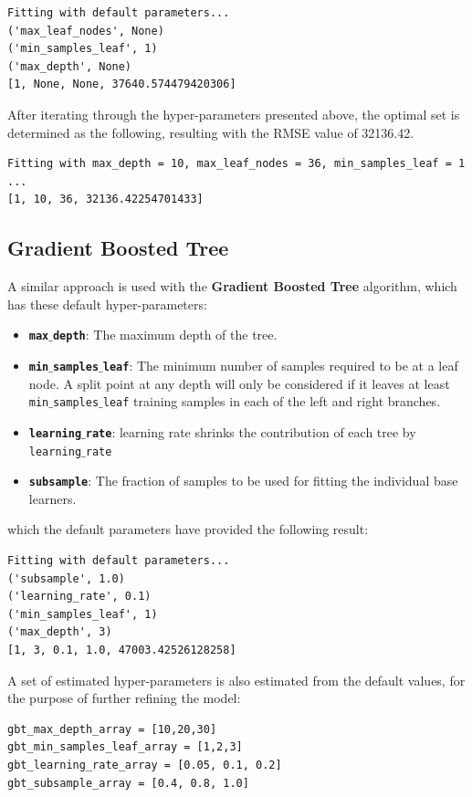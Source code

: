 \documentclass[11pt,a4paper,titlepage]{article}
\begin{document}
\begin{verbatim}
Fitting with default parameters...
('max_leaf_nodes', None)
('min_samples_leaf', 1)
('max_depth', None)
[1, None, None, 37640.574479420306]
\end{verbatim}

After iterating through the hyper-parameters presented above, the optimal set is determined as the following, resulting with the RMSE value of 32136.42.

\begin{verbatim}
Fitting with max_depth = 10, max_leaf_nodes = 36, min_samples_leaf = 1 ...
[1, 10, 36, 32136.42254701433]
\end{verbatim}

\subsection{Gradient Boosted Tree}

A similar approach is used with the \textbf{Gradient Boosted Tree} algorithm, which has these default hyper-parameters:

\begin{itemize}
    \item{\textbf{\texttt{max$\_$depth}}: The maximum depth of the tree.}
    \item{\textbf{\texttt{min$\_$samples$\_$leaf}}: The minimum number of samples required to be at a leaf node. A split point at any depth will only be considered if it leaves at least \texttt{min$\_$samples$\_$leaf} training samples in each of the left and right branches.}
    \item{\textbf{\texttt{learning$\_$rate}}: learning rate shrinks the contribution of each tree by \texttt{learning$\_$rate}}
    \item{\textbf{\texttt{subsample}}: The fraction of samples to be used for fitting the individual base learners.}
\end{itemize}
which the default parameters have provided the following result:

\begin{verbatim}
Fitting with default parameters...
('subsample', 1.0)
('learning_rate', 0.1)
('min_samples_leaf', 1)
('max_depth', 3)
[1, 3, 0.1, 1.0, 47003.42526128258]
\end{verbatim}

A set of estimated hyper-parameters is also estimated from the default values, for the purpose of further refining the model:

\begin{verbatim}
gbt_max_depth_array = [10,20,30]
gbt_min_samples_leaf_array = [1,2,3]
gbt_learning_rate_array = [0.05, 0.1, 0.2]
gbt_subsample_array = [0.4, 0.8, 1.0]
\end{verbatim}
\end{document}

